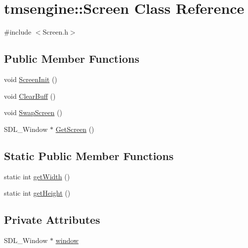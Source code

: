 \hypertarget{classtmsengine_1_1_screen}{}\section{tmsengine\+:\+:Screen Class Reference}
\label{classtmsengine_1_1_screen}


{\ttfamily \#include $<$Screen.\+h$>$}

\subsection*{Public Member Functions}
\begin{DoxyCompactItemize}
\item 
void \hyperlink{classtmsengine_1_1_screen_a532300498d439e91852b1c400bc5548a}{Screen\+Init} ()
\item 
void \hyperlink{classtmsengine_1_1_screen_ab662ffd34dd93ef78adc63a3bfc6db18}{Clear\+Buff} ()
\item 
void \hyperlink{classtmsengine_1_1_screen_af9c6d28da2a6008de16c358321aa12ab}{Swap\+Screen} ()
\item 
S\+D\+L\+\_\+\+Window $\ast$ \hyperlink{classtmsengine_1_1_screen_acda07bc9c3c4dbff93b9a5c52a1a26b2}{Get\+Screen} ()
\end{DoxyCompactItemize}
\subsection*{Static Public Member Functions}
\begin{DoxyCompactItemize}
\item 
static int \hyperlink{classtmsengine_1_1_screen_a705d20e6bdc79d8a176cffee3f4de363}{get\+Width} ()
\item 
static int \hyperlink{classtmsengine_1_1_screen_a0192fc98efb3fb523858082312fbe1a7}{get\+Height} ()
\end{DoxyCompactItemize}
\subsection*{Private Attributes}
\begin{DoxyCompactItemize}
\item 
S\+D\+L\+\_\+\+Window $\ast$ \hyperlink{classtmsengine_1_1_screen_a0fa3ebd5ed7a46a76312f09623a447f3}{window}
\end{DoxyCompactItemize}
